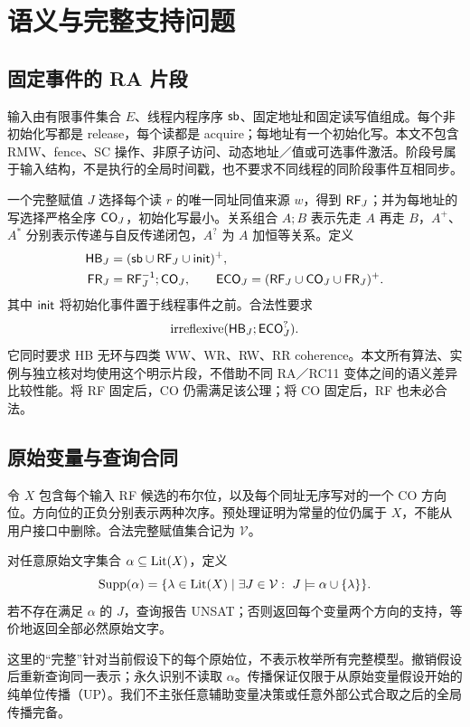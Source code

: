 \section{语义与完整支持问题}\label{sec:model}
\subsection{固定事件的 RA 片段}
输入由有限事件集合 $E$、线程内程序序 $\mathsf{sb}$、固定地址和固定读写值组成。每个非初始化写都是 release，每个读都是 acquire；每地址有一个初始化写。本文不包含 RMW、fence、SC 操作、非原子访问、动态地址／值或可选事件激活。阶段号属于输入结构，不是执行的全局时间戳，也不要求不同线程的同阶段事件互相同步。

一个完整赋值 $J$ 选择每个读 $r$ 的唯一同址同值来源 $w$，得到 $\mathsf{RF}_J$；并为每地址的写选择严格全序 $\mathsf{CO}_J$，初始化写最小。关系组合 $A;B$ 表示先走 $A$ 再走 $B$，$A^+$、$A^*$ 分别表示传递与自反传递闭包，$A^?$ 为 $A$ 加恒等关系。定义
\begin{align}
 \mathsf{HB}_J &= (\mathsf{sb}\cup\mathsf{RF}_J\cup\mathsf{init})^+,\label{eq:hb}\\
 \mathsf{FR}_J &= \mathsf{RF}_J^{-1};\mathsf{CO}_J,\qquad
 \mathsf{ECO}_J=(\mathsf{RF}_J\cup\mathsf{CO}_J\cup\mathsf{FR}_J)^+.
\end{align}
其中 $\mathsf{init}$ 将初始化事件置于线程事件之前。合法性要求
\begin{equation}
 \operatorname{irreflexive}(\mathsf{HB}_J;\mathsf{ECO}_J^?).\label{eq:ra}
\end{equation}
它同时要求 HB 无环与四类 WW、WR、RW、RR coherence。本文所有算法、实例与独立核对均使用这个明示片段，不借助不同 RA／RC11 变体之间的语义差异比较性能。将 RF 固定后，CO 仍需满足该公理；将 CO 固定后，RF 也未必合法。

\subsection{原始变量与查询合同}
令 $X$ 包含每个输入 RF 候选的布尔位，以及每个同址无序写对的一个 CO 方向位。方向位的正负分别表示两种次序。预处理证明为常量的位仍属于 $X$，不能从用户接口中删除。合法完整赋值集合记为 $\mathcal V$。

\begin{cdef}[原始支持]
对任意原始文字集合 $\alpha\subseteq\mathop{\mathrm{Lit}}(X)$，定义
\[
 \supp(\alpha)=\{\lambda\in\Lit(X)\mid
       \exists J\in\mathcal V:\ J\models\alpha\cup\{\lambda\}\}.
\]
若不存在满足 $\alpha$ 的 $J$，查询报告 UNSAT；否则返回每个变量两个方向的支持，等价地返回全部必然原始文字。
\end{cdef}

这里的“完整”针对当前假设下的每个原始位，不表示枚举所有完整模型。撤销假设后重新查询同一表示；永久识别不读取 $\alpha$。传播保证仅限于从原始变量假设开始的纯单位传播（UP）。我们不主张任意辅助变量决策或任意外部公式合取之后的全局传播完备。

